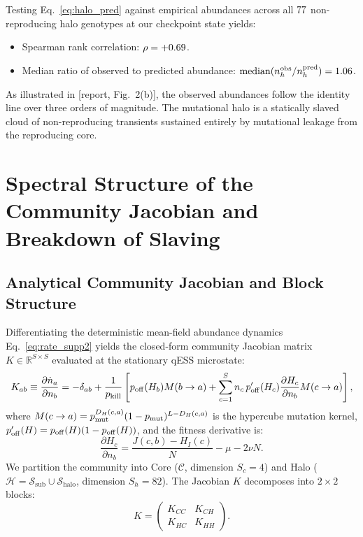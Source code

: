 \documentclass[11pt,a4paper]{article}
\newcommand{\pk}{p_{\rm kill}}
\newcommand{\pmut}{p_{\rm mut}}
\newcommand{\poff}{p_{\rm off}}
\newcommand{\R}[1]{\textcolor{blue!55!black}{[report, #1]}}
\begin{document}
Testing Eq.~\eqref{eq:halo_pred} against empirical abundances across all $77$ non-reproducing halo genotypes at our checkpoint state yields:
\begin{itemize}
\item Spearman rank correlation: $\rho = +0.69$.
\item Median ratio of observed to predicted abundance: $\operatorname{median}(n_h^{\mathrm{obs}} / n_h^{\mathrm{pred}}) = 1.06$.
\end{itemize}
As illustrated in \R{Fig.~2(b)}, the observed abundances follow the identity line over three orders of magnitude. The mutational halo is a statically slaved cloud of non-reproducing transients sustained entirely by mutational leakage from the reproducing core.

\section{Spectral Structure of the Community Jacobian and Breakdown of Slaving}
\label{sec:jacobian_spectrum}

\subsection{Analytical Community Jacobian and Block Structure}

Differentiating the deterministic mean-field abundance dynamics Eq.~\eqref{eq:rate_supp2} yields the closed-form community Jacobian matrix $K \in \mathbb{R}^{S \times S}$ evaluated at the stationary qESS microstate:
\begin{equation}
K_{ab} \equiv \frac{\partial \dot{n}_a}{\partial n_b} = -\delta_{ab} + \frac{1}{\pk} \left[ \poff(H_b) M(b \to a) + \sum_{c=1}^S n_c \, \poff'(H_c) \frac{\partial H_c}{\partial n_b} M(c \to a) \right],
\label{eq:K_explicit_supp2}
\end{equation}
where $M(c \to a) = \pmut^{D_H(c,a)} (1 - \pmut)^{L - D_H(c,a)}$ is the hypercube mutation kernel, $\poff'(H) = \poff(H)(1 - \poff(H))$, and the fitness derivative is:
\begin{equation}
\frac{\partial H_c}{\partial n_b} = \frac{J(c,b) - H_I(c)}{N} - \mu - 2\nu N.
\label{eq:dH_explicit_supp2}
\end{equation}
We partition the community into Core ($\mathcal{C}$, dimension $S_c = 4$) and Halo ($\mathcal{H} = \mathcal{S}_{\mathrm{sub}} \cup \mathcal{S}_{\mathrm{halo}}$, dimension $S_h = 82$). The Jacobian $K$ decomposes into $2 \times 2$ blocks:
\begin{equation}
K = \begin{pmatrix} K_{CC} & K_{CH} \\ K_{HC} & K_{HH} \end{pmatrix}.
\label{eq:K_blocks}
\end{equation}
\end{document}
